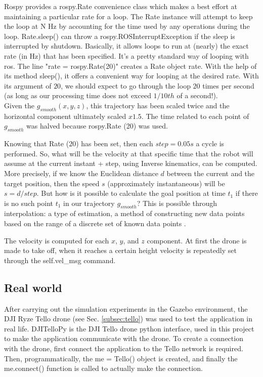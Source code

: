 \noindent Rospy provides a rospy.Rate convenience class which makes a best effort at maintaining a particular rate for a loop. The Rate instance will attempt to keep the loop at N Hz by accounting for the time used by any operations during the loop. Rate.sleep() can throw a rospy.ROSInterruptException if the sleep is interrupted by shutdown. Basically, it allows loops to run at (nearly) the exact rate (in Hz) that has been specified. It's a pretty standard way of looping with \gls{ros}. The line "rate = rospy.Rate(20)" creates a Rate object rate. With the help of its method sleep(), it offers a convenient way for looping at the desired rate. With its argument of $20$, we should expect to go through the loop $20$ times per second (as long as our processing time does not exceed $1/10th$ of a second!). \\

\noindent Given the $g_{smooth}(x, y, z)$, this trajectory has been scaled twice and the horizontal component ultimately scaled $x1.5$. The time related to each point of $g_{smooth}$ was halved because rospy.Rate (20) was used.

\noindent Knowing that Rate ($20$) has been set, then each $step = 0.05s$ a cycle is performed. So, what will be the velocity at that specific time that the robot will assume at the current instant + step, using Inverse kinematics, can be computed. More precisely, if we know the Euclidean distance $d$ between the current and the target position, then the speed $s$ (approximately instantaneous) will be $s = d / step$. But how is it possible to calculate the goal position at time $t_1$ if there is no such point $t_1$ in our trajectory $g_{smooth}$? This is possible through interpolation: a type of estimation, a method of constructing new data points based on the range of a discrete set of known data points \cite[]{Interpol33:online}.

\noindent The velocity is computed for each $x$, $y$, and $z$ component. At first the drone is made to take off, when it reaches a certain height velocity is repeatedly set through the self.vel\_msg command.

\subsection{Real world}
\label{sec:realworld}
After carrying out the simulation experiments in the Gazebo environment, the DJI Ryze Tello drone (see Sec. \ref{subsec:tello}) was used to test the application in real life. DJITelloPy is the DJI Tello drone python interface, used in this project to make the application communicate with the drone. To create a connection with the drone, first connect the application to the Tello network is required. Then, programmatically, the me = Tello() object is created, and finally the me.connect() function is called to actually make the connection. \\

